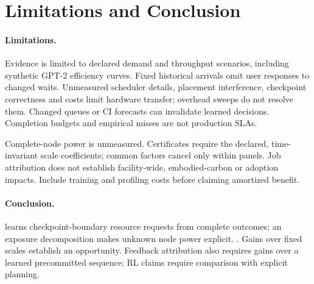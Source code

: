 \section{Limitations and Conclusion}

\paragraph{Limitations.}
Evidence is limited to declared demand and throughput scenarios, including
synthetic GPT-2 efficiency curves. Fixed historical arrivals omit user responses
to changed waits. Unmeasured scheduler details, placement interference,
checkpoint correctness and costs limit hardware transfer; overhead sweeps do
not resolve them. Changed queues or CI forecasts can invalidate learned
decisions. Completion budgets and empirical misses are not production SLAs.

Complete-node power is unmeasured. Certificates require the declared,
time-invariant scale coefficients; common factors cancel only within panels.
Job attribution does not establish facility-wide, embodied-carbon or adoption
impacts. Include training and profiling costs before claiming amortized benefit.

\paragraph{Conclusion.}
\name{} learns checkpoint-boundary resource requests from complete outcomes;
an exposure decomposition makes unknown node power explicit.
.
Gains over fixed scales establish an opportunity. Feedback attribution also
requires gains over a learned precommitted sequence; RL claims require
comparison with explicit planning.
